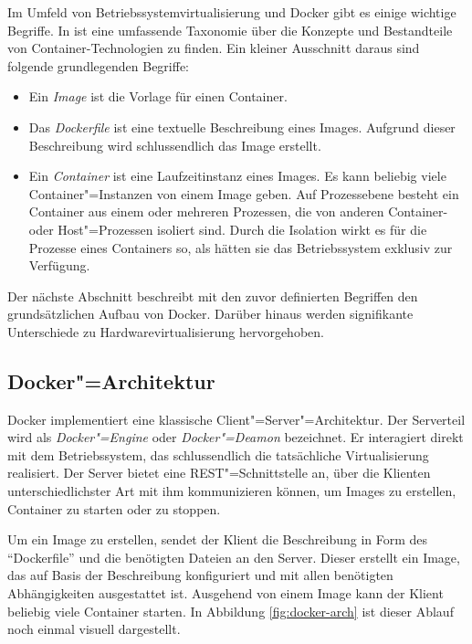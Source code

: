 Im Umfeld von Betriebssystemvirtualisierung und Docker gibt es einige wichtige Begriffe. In \cite{paper_ernst_containers} ist eine umfassende Taxonomie über die Konzepte und Bestandteile von Container-Technologien zu finden. Ein kleiner Ausschnitt daraus sind folgende grundlegenden Begriffe:

\begin{itemize}
	\item Ein \textit{Image} ist die Vorlage für einen Container.
	\item Das \textit{Dockerfile} ist eine textuelle Beschreibung eines Images. Aufgrund dieser Beschreibung wird schlussendlich das Image erstellt.
	\item Ein \textit{Container} ist eine Laufzeitinstanz eines Images. Es kann beliebig viele Container"=Instanzen von einem Image geben. Auf Prozessebene besteht ein Container aus einem oder mehreren Prozessen, die von anderen Container- oder Host"=Prozessen isoliert sind. Durch die Isolation wirkt es für die Prozesse eines Containers so, als hätten sie das Betriebssystem exklusiv zur Verfügung.
\end{itemize}

Der nächste Abschnitt beschreibt mit den zuvor definierten Begriffen den grundsätzlichen Aufbau von Docker. Darüber hinaus werden signifikante Unterschiede zu Hardwarevirtualisierung hervorgehoben.

\subsection{Docker"=Architektur}

Docker implementiert eine klassische Client"=Server"=Architektur. Der Serverteil wird als \textit{Docker"=Engine} oder \textit{Docker"=Deamon} bezeichnet. Er interagiert direkt mit dem Betriebssystem, das schlussendlich die tatsächliche Virtualisierung realisiert. Der Server bietet eine REST"=Schnittstelle an, über die Klienten unterschiedlichster Art mit ihm kommunizieren können, um \zB Images zu erstellen, Container zu starten oder zu stoppen.

Um ein Image zu erstellen, sendet der Klient die Beschreibung in Form des "`Dockerfile"' und die benötigten Dateien an den Server. Dieser erstellt ein Image, das auf Basis der Beschreibung konfiguriert und mit allen benötigten Abhängigkeiten ausgestattet ist. Ausgehend von einem Image kann der Klient beliebig viele Container starten. In Abbildung \ref{fig:docker-arch} ist dieser Ablauf noch einmal visuell dargestellt.

